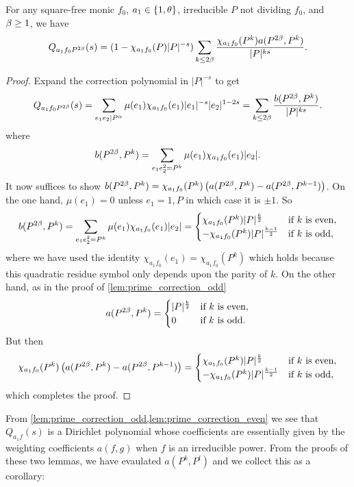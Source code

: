 \documentclass[12pt,reqno,oneside]{amsart}
\begin{document}
    \begin{lemma}\label{lem:prime_correction_even}
        For any square-free monic $f_{0}$, $a_{1} \in \{1,\theta\}$, irreducible $P$ not dividing $f_{0}$, and $\beta \ge 1$, we have
        \[
            Q_{a_{1}f_{0}P^{2\beta}}(s) = (1-\chi_{a_{1}f_{0}}(P)|P|^{-s})\sum_{k \le 2\beta}\frac{\chi_{a_{1}f_{0}}(P^{k})a(P^{2\beta},P^{k})}{|P|^{ks}}.
        \]
    \end{lemma}
    \begin{proof}
        Expand the correction polynomial in $|P|^{-s}$ to get
        \[
            Q_{a_{1}f_{0}P^{2\beta}}(s) = \sum_{e_{1}e_{2} \mid P^{\alpha}}\mu(e_{1})\chi_{a_{1}f_{0}}(e_{1})|e_{1}|^{-s}|e_{2}|^{1-2s} = \sum_{k \le 2\beta}\frac{b(P^{2\beta},P^{k})}{|P|^{ks}}.
        \]
        where
        \[
            b(P^{2\beta},P^{k}) = \sum_{e_{1}e_{2}^{2} = P^{k}}\mu(e_{1})\chi_{a_{1}f_{0}}(e_{1})|e_{2}|.
        \]
        It now suffices to show $b(P^{2\beta},P^{k}) = \chi_{a_{1}f_{0}}(P^{k})\left(a(P^{2\beta},P^{k})-a(P^{2\beta},P^{k-1})\right)$. On the one hand, $\mu(e_{1}) = 0$ unless $e_{1} = 1,P$ in which case it is $\pm1$. So
        \[
            b(P^{2\beta},P^{k}) = \sum_{e_{1}e_{2}^{2} = P^{k}}\mu(e_{1})\chi_{a_{1}f_{0}}(e_{1})|e_{2}| = \begin{cases} \chi_{a_{1}f_{0}}(P^{k})|P|^{\frac{k}{2}} & \text{if $k$ is even}, \\ -\chi_{a_{1}f_{0}}(P^{k})|P|^{\frac{k-1}{2}} & \text{if $k$ is odd}, \end{cases}
        \]
        where we have used the identity $\chi_{a_{1}f_{0}}(e_{1}) = \chi_{a_{1}f_{0}}(P^{k})$ which holds because this quadratic residue symbol only depends upon the parity of $k$. On the other hand, as in the proof of \cref{lem:prime_correction_odd} 
        \[
            a(P^{2\beta},P^{k}) = \begin{cases} |P|^{\frac{k}{2}} & \text{if $k$ is even}, \\ 0 & \text{if $k$ is odd}. \end{cases}
        \]
        But then
        \[
            \chi_{a_{1}f_{0}}(P^{k})\left(a(P^{2\beta},P^{k})-a(P^{2\beta},P^{k-1})\right) = \begin{cases} \chi_{a_{1}f_{0}}(P^{k})|P|^{\frac{k}{2}} & \text{if $k$ is even}, \\ -\chi_{a_{1}f_{0}}(P^{k})|P|^{\frac{k-1}{2}} & \text{if $k$ is odd}, \end{cases}
        \]
        which completes the proof.
    \end{proof}

    From \cref{lem:prime_correction_odd,lem:prime_correction_even} we see that $Q_{a_{1}f}(s)$ is a Dirichlet polynomial whose coefficients are essentially given by the weighting coefficients $a(f,g)$ when $f$ is an irreducible power. From the proofs of these two lemmas, we have evaulated $a(P^{k},P^{l})$ and we collect this as a corollary:
\end{document}
